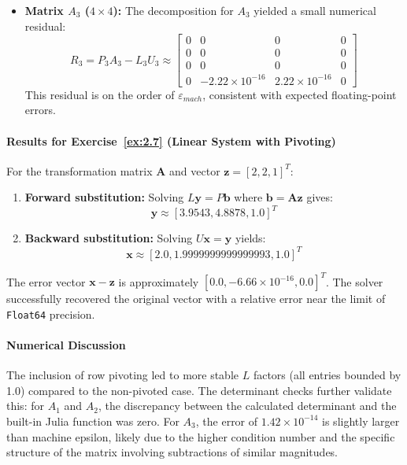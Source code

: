 \begin{solution}
\begin{itemize}
        \item \textbf{Matrix $A_3$ ($4\times4$):}
        The decomposition for $A_3$ yielded a small numerical residual:
        \[
        R_3 = P_3 A_3 - L_3 U_3 \approx \begin{bmatrix} 0 & 0 & 0 & 0 \\ 0 & 0 & 0 & 0 \\ 0 & 0 & 0 & 0 \\ 0 & -2.22\times10^{-16} & 2.22\times10^{-16} & 0 \end{bmatrix}
        \]
        This residual is on the order of $\varepsilon_{mach}$, consistent with expected floating-point errors.
    \end{itemize}


    \paragraph{Results for Exercise~\ref{ex:2.7} (Linear System with Pivoting)}
    For the transformation matrix $\mathbf{A}$ and vector $\mathbf{z} = [2, 2, 1]^T$:
    \begin{enumerate}
        \item \textbf{Forward substitution:} Solving $L\mathbf{y} = P\mathbf{b}$ where $\mathbf{b} = \mathbf{Az}$ gives:
        \[ \mathbf{y} \approx [3.9543, 4.8878, 1.0]^T \]
        \item \textbf{Backward substitution:} Solving $U\mathbf{x} = \mathbf{y}$ yields:
        \[ \mathbf{x} \approx [2.0, 1.9999999999999993, 1.0]^T \]
    \end{enumerate}
    The error vector $\mathbf{x} - \mathbf{z}$ is approximately $[0.0, -6.66 \times 10^{-16}, 0.0]^T$. The solver successfully recovered the original vector with a relative error near the limit of \texttt{Float64} precision.

    \paragraph{Numerical Discussion}
    The inclusion of row pivoting led to more stable $L$ factors (all entries bounded by 1.0) compared to the non-pivoted case. The determinant checks further validate this: for $A_1$ and $A_2$, the discrepancy between the calculated determinant and the built-in Julia function was zero. For $A_3$, the error of $1.42 \times 10^{-14}$ is slightly larger than machine epsilon, likely due to the higher condition number and the specific structure of the matrix involving subtractions of similar magnitudes.
\end{solution}


